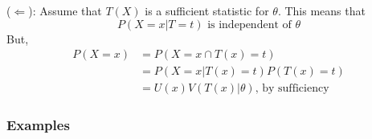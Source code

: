 \documentclass{article}
\begin{document}
($\Leftarrow$): Assume that $T(X)$ is a sufficient statistic for $\theta$. This means that
\begin{equation*}
    P(X=x|T=t) \text{ is independent of $\theta$}
\end{equation*}
But,
\begin{equation*}
    \begin{split}
        P(X=x) &= P(X=x \cap T(x) = t)\\
            &= P(X=x|T(x)=t)P(T(x)=t)\\
            &= U(x) V(T(x)|\theta) \text{, by sufficiency}
    \end{split}
\end{equation*}

\subsubsection{Examples}
\end{document}
